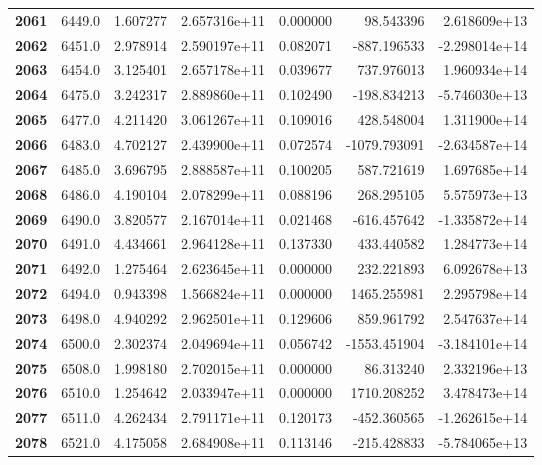 \documentclass{report}[12pt]
\begin{document}
\begin{center}
\begin{tabular}{lrrrrrr}
\textbf{2061} &         6449.0 &   1.607277 &  2.657316e+11 &    0.000000 &    98.543396 &  2.618609e+13 \\
\textbf{2062} &         6451.0 &   2.978914 &  2.590197e+11 &    0.082071 &  -887.196533 & -2.298014e+14 \\
\textbf{2063} &         6454.0 &   3.125401 &  2.657178e+11 &    0.039677 &   737.976013 &  1.960934e+14 \\
\textbf{2064} &         6475.0 &   3.242317 &  2.889860e+11 &    0.102490 &  -198.834213 & -5.746030e+13 \\
\textbf{2065} &         6477.0 &   4.211420 &  3.061267e+11 &    0.109016 &   428.548004 &  1.311900e+14 \\
\textbf{2066} &         6483.0 &   4.702127 &  2.439900e+11 &    0.072574 & -1079.793091 & -2.634587e+14 \\
\textbf{2067} &         6485.0 &   3.696795 &  2.888587e+11 &    0.100205 &   587.721619 &  1.697685e+14 \\
\textbf{2068} &         6486.0 &   4.190104 &  2.078299e+11 &    0.088196 &   268.295105 &  5.575973e+13 \\
\textbf{2069} &         6490.0 &   3.820577 &  2.167014e+11 &    0.021468 &  -616.457642 & -1.335872e+14 \\
\textbf{2070} &         6491.0 &   4.434661 &  2.964128e+11 &    0.137330 &   433.440582 &  1.284773e+14 \\
\textbf{2071} &         6492.0 &   1.275464 &  2.623645e+11 &    0.000000 &   232.221893 &  6.092678e+13 \\
\textbf{2072} &         6494.0 &   0.943398 &  1.566824e+11 &    0.000000 &  1465.255981 &  2.295798e+14 \\
\textbf{2073} &         6498.0 &   4.940292 &  2.962501e+11 &    0.129606 &   859.961792 &  2.547637e+14 \\
\textbf{2074} &         6500.0 &   2.302374 &  2.049694e+11 &    0.056742 & -1553.451904 & -3.184101e+14 \\
\textbf{2075} &         6508.0 &   1.998180 &  2.702015e+11 &    0.000000 &    86.313240 &  2.332196e+13 \\
\textbf{2076} &         6510.0 &   1.254642 &  2.033947e+11 &    0.000000 &  1710.208252 &  3.478473e+14 \\
\textbf{2077} &         6511.0 &   4.262434 &  2.791171e+11 &    0.120173 &  -452.360565 & -1.262615e+14 \\
\textbf{2078} &         6521.0 &   4.175058 &  2.684908e+11 &    0.113146 &  -215.428833 & -5.784065e+13 \\

\end{tabular}
\end{center}
\end{document}
